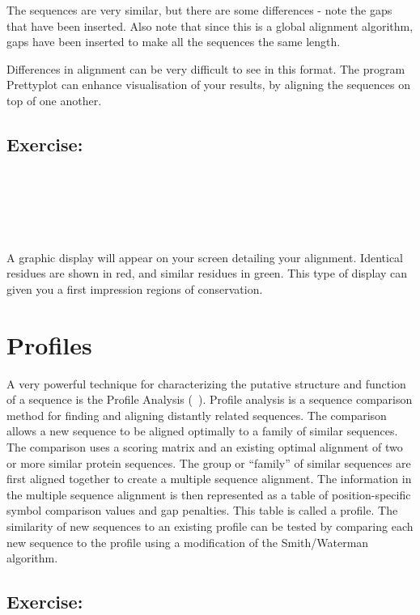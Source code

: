 \documentclass[12pt]{report}
\begin{document}
The sequences are very similar,	but there are some differences - note
the gaps that have been	inserted. Also note that since this is a
global alignment algorithm, gaps have been inserted to make all	the
sequences the same length.

Differences in alignment can be	very difficult to see in this format.
The program Prettyplot can enhance visualisation of your results, by
aligning the sequences on top of one another.

\subsection*{Exercise: }

\unix{}\\
\\
\\
\\
\\

A graphic display will appear on your screen detailing your alignment.
Identical residues are shown in red, and similar residues in green.
This type of display can given you a first impression regions of conservation.

\section{Profiles}
A very powerful	technique for characterizing the putative structure
and function of	a sequence is the Profile Analysis (~\cite{Gribskov:87}). Profile analysis is a	sequence comparison method for finding
and aligning distantly related sequences. The comparison allows	a new
sequence to be aligned optimally to a family of	similar	sequences.
The comparison uses a scoring matrix and an existing optimal alignment
of two or more similar protein sequences.  The group or	``family'' of
similar	sequences are first aligned together to	create a multiple
sequence alignment. The	information in the multiple sequence alignment
is then	represented as a table of position-specific
symbol comparison values and gap penalties.  This table	is called a
profile. The similarity	of new sequences to an existing	profile	can
be tested by comparing each new	sequence to the	profile	using a
modification of	the Smith/Waterman algorithm.

\subsection*{Exercise: }
\end{document}
